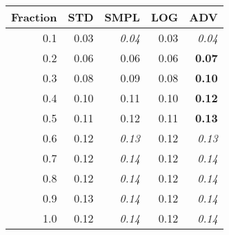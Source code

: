 \documentclass{standalone}
\begin{document}
\begin{tabular}{r|rrrr}
      \toprule
      Fraction & STD & SMPL & LOG & ADV\\
      \midrule
      0.1 & 0.03 & \emph{0.04} & 0.03 & \emph{0.04}\\
  0.2 & 0.06 & 0.06 & 0.06 & \textbf{0.07}\\
  0.3 & 0.08 & 0.09 & 0.08 & \textbf{0.10}\\
  0.4 & 0.10 & 0.11 & 0.10 & \textbf{0.12}\\
  0.5 & 0.11 & 0.12 & 0.11 & \textbf{0.13}\\
  0.6 & 0.12 & \emph{0.13} & 0.12 & \emph{0.13}\\
  0.7 & 0.12 & \emph{0.14} & 0.12 & \emph{0.14}\\
  0.8 & 0.12 & \emph{0.14} & 0.12 & \emph{0.14}\\
  0.9 & 0.13 & \emph{0.14} & 0.12 & \emph{0.14}\\
  1.0 & 0.12 & \emph{0.14} & 0.12 & \emph{0.14}\\
  \bottomrule
\end{tabular}
\end{document}
